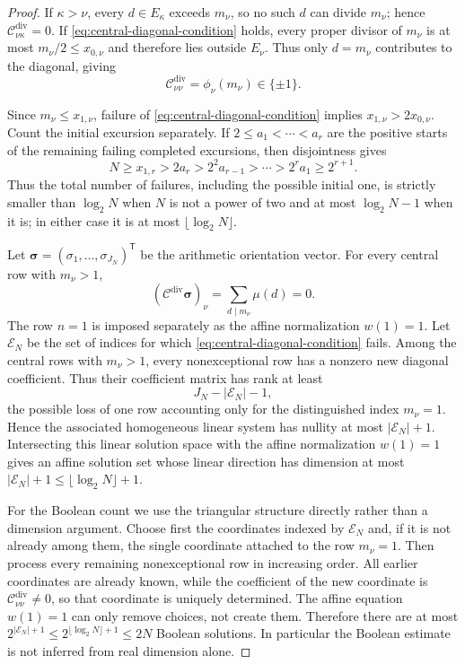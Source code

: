 \documentclass[11pt,reqno]{amsart}
\numberwithin{equation}{section}
\theoremstyle{plain}
\theoremstyle{definition}
\theoremstyle{remark}
\begin{document}
\begin{proof}
If $\kappa>\nu$, every $d\in E_\kappa$ exceeds $m_\nu$, so no such $d$ can
divide $m_\nu$; hence $\mathscr C^{\mathrm{div}}_{\nu\kappa}=0$.  If
\eqref{eq:central-diagonal-condition} holds, every proper divisor of
$m_\nu$ is at most $m_\nu/2\le x_{0,\nu}$ and therefore lies outside
$E_\nu$.  Thus only $d=m_\nu$ contributes to the diagonal, giving
\begin{equation}
\mathscr C^{\mathrm{div}}_{\nu\nu}=\phi_\nu(m_\nu)\in\{\pm1\}.
\end{equation}

Since $m_\nu\le x_{1,\nu}$, failure of
\eqref{eq:central-diagonal-condition} implies
$x_{1,\nu}>2x_{0,\nu}$.  Count the initial excursion separately.  If
$2\le a_1<\cdots<a_r$ are the positive starts of the remaining failing
completed excursions, then disjointness gives
\begin{equation}
N\ge x_{1,r}>2a_r>2^2a_{r-1}>\cdots>2^r a_1\ge2^{r+1}.
\end{equation}
Thus the total number of failures, including the possible initial one, is
strictly smaller than $\log_2N$ when $N$ is not a power of two and at most
$\log_2N-1$ when it is; in either case it is at most
$\lfloor\log_2N\rfloor$.

Let $\boldsymbol\sigma=(\sigma_1,\dots,\sigma_{J_N})^{\mathsf T}$ be the
arithmetic orientation vector.  For every central row with $m_\nu>1$,
\begin{equation}
(\mathscr C^{\mathrm{div}}\boldsymbol\sigma)_\nu
=
\sum_{d\mid m_\nu}\mu(d)=0.
\end{equation}
The row $n=1$ is imposed separately as the affine normalization $w(1)=1$.
Let $\mathcal E_N$ be the set of indices for which
\eqref{eq:central-diagonal-condition} fails.  Among the central rows with
$m_\nu>1$, every nonexceptional row has a nonzero new diagonal coefficient.
Thus their coefficient matrix has rank at least
\begin{equation}
J_N-|\mathcal E_N|-1,
\end{equation}
the possible loss of one row accounting only for the distinguished index
$m_\nu=1$.  Hence the associated homogeneous linear system has nullity at
most $|\mathcal E_N|+1$.  Intersecting this linear solution space with the
affine normalization $w(1)=1$ gives an affine solution set whose linear
direction has dimension at most $|\mathcal E_N|+1\le
\lfloor\log_2N\rfloor+1$.

For the Boolean count we use the triangular structure directly rather than a
dimension argument.  Choose first the coordinates indexed by $\mathcal E_N$
and, if it is not already among them, the single coordinate attached to the
row $m_\nu=1$.  Then process every remaining nonexceptional row in increasing
order.  All earlier coordinates are already known, while the coefficient of
the new coordinate is $\mathscr C^{\mathrm{div}}_{\nu\nu}\ne0$, so that
coordinate is uniquely determined.  The affine equation $w(1)=1$ can only
remove choices, not create them.  Therefore there are at most
$2^{|\mathcal E_N|+1}\le2^{\lfloor\log_2N\rfloor+1}\le2N$ Boolean
solutions.  In particular the Boolean estimate is not inferred from real
dimension alone.


\end{proof}
\end{document}
